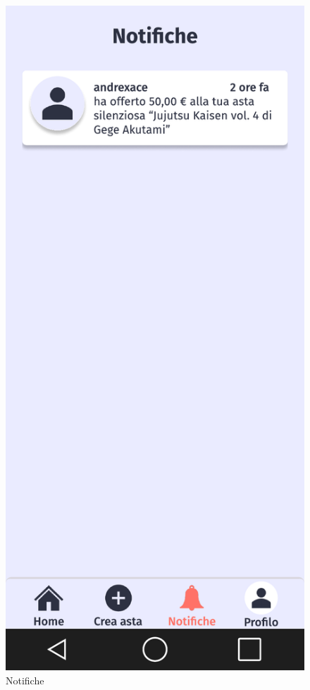 \begin{figure}[!htb]
\begin{minipage}{0.32\textwidth}
                \includegraphics[width=.7\linewidth]{Immagini/Frames/Venditore/V6.pdf}
                \caption{Notifiche}
            \end{minipage}\hfill
        \end{figure}

    \clearpage
    
